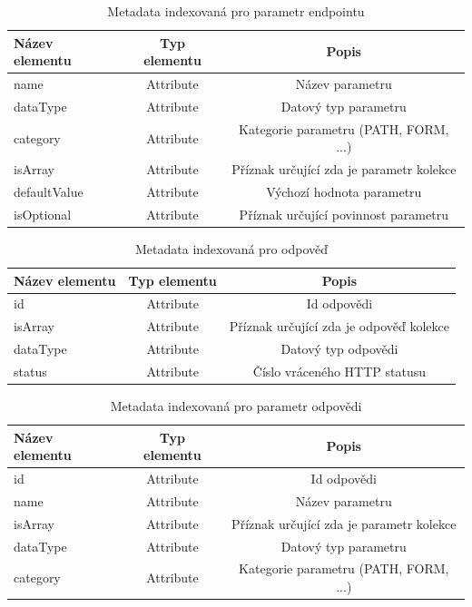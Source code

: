 \documentclass[czech,DP]{thesiskiv}
\begin{document}
\begin{table}[h]
	\centering
	\begin{tabular}{|l|c|c|}
		\hline
		Název elementu & Typ elementu & Popis \\ 
		\hline
		\hline
		name & Attribute & Název parametru \\
		\hline
		dataType & Attribute & Datový typ parametru \\
		\hline
		category & Attribute & Kategorie parametru (PATH, FORM, ...) \\
		\hline
		isArray & Attribute & Příznak určující zda je parametr kolekce \\
		\hline
		defaultValue & Attribute & Výchozí hodnota parametru \\
		\hline
		isOptional & Attribute & Příznak určující povinnost parametru \\
		\hline
	\end{tabular}
	\caption{Metadata indexovaná pro parametr endpointu}
\end{table}

\begin{table}
	\centering
	\begin{tabular}{|l|c|c|}
		\hline
		Název elementu & Typ elementu & Popis \\ 
		\hline
		\hline
		id & Attribute & Id odpovědi \\
		\hline
		isArray & Attribute & Příznak určující zda je odpověď kolekce \\
		\hline
		dataType & Attribute & Datový typ odpovědi \\
		\hline
		status & Attribute & Číslo vráceného HTTP statusu \\
		\hline
	\end{tabular}
	\caption{Metadata indexovaná pro odpověď}
\end{table}

\begin{table}
	\centering
	\begin{tabular}{|l|c|c|}
		\hline
		Název elementu & Typ elementu & Popis \\ 
		\hline
		\hline
		id & Attribute & Id odpovědi \\
		\hline
		name & Attribute & Název parametru \\
		\hline
		isArray & Attribute & Příznak určující zda je parametr kolekce \\
		\hline
		dataType & Attribute & Datový typ parametru \\
		\hline
		category & Attribute & Kategorie parametru (PATH, FORM, ...) \\
		\hline
	\end{tabular}
	\caption{Metadata indexovaná pro parametr odpovědi}
\end{table}
\end{document}
